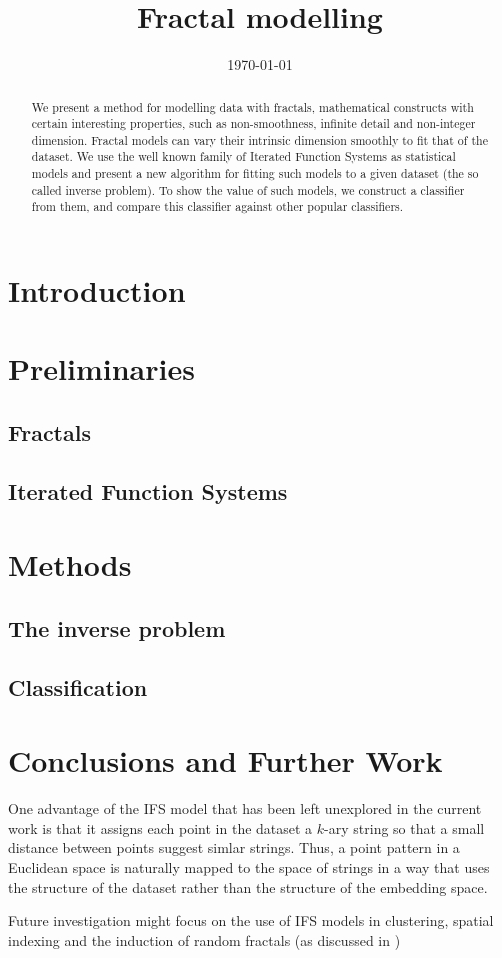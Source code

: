 \documentclass{article}
\title{Fractal modelling}
\date{\today}
\theoremstyle{definition}
\begin{document}
\maketitle

\begin{abstract}
We present a method for modelling data with fractals, mathematical constructs with certain interesting properties, such as non-smoothness, infinite detail and non-integer dimension. Fractal models can vary their intrinsic dimension smoothly to fit that of the dataset. We use the well known family of Iterated Function Systems as statistical models and present a new algorithm for fitting such models to a given dataset (the so called inverse problem). To show the value of such models, we construct a classifier from them, and compare this classifier against other popular classifiers.
\end{abstract}

\section{Introduction}
\section{Preliminaries}
\subsection{Fractals}
\subsection{Iterated Function Systems}
\section{Methods}
\subsection{The inverse problem}
\subsection{Classification}
\section{Conclusions and Further Work}

One advantage of the IFS model that has been left unexplored in the current work is that it assigns each point in the dataset a $k$-ary string so that a small distance between points suggest simlar strings. Thus, a point pattern in a Euclidean space is naturally mapped to the space of strings in a way that uses the structure of the dataset rather than the structure of the embedding space.

Future investigation might focus on the use of IFS models in clustering, spatial indexing and the induction of random fractals (as discussed in \cite{})
\end{document}
